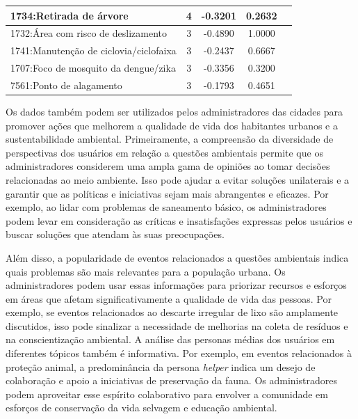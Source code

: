 \begin{table}[htbp]
\begin{tabular}{|l|c|c|c|c|}
		\hline
		1734:Retirada de árvore                     & 4                & -0.3201        & 0.2632           \\
		\hline
		1732:Área com risco de deslizamento         & 3                & -0.4890        & 1.0000           \\
		\hline
		1741:Manutenção de ciclovia/ciclofaixa      & 3                & -0.2437        & 0.6667           \\
		\hline
		1707:Foco de mosquito da dengue/zika        & 3                & -0.3356        & 0.3200           \\
		\hline
		7561:Ponto de alagamento                    & 3                & -0.1793        & 0.4651           \\
		\hline
	\end{tabular}
\end{table}

Os dados também podem ser utilizados pelos administradores das cidades para promover ações que melhorem a qualidade de vida dos habitantes urbanos e a sustentabilidade ambiental. Primeiramente, a compreensão da diversidade de perspectivas dos usuários em relação a questões ambientais permite que os administradores considerem uma ampla gama de opiniões ao tomar decisões relacionadas ao meio ambiente. Isso pode ajudar a evitar soluções unilaterais e a garantir que as políticas e iniciativas sejam mais abrangentes e eficazes. Por exemplo, ao lidar com problemas de saneamento básico, os administradores podem levar em consideração as críticas e insatisfações expressas pelos usuários e buscar soluções que atendam às suas preocupações.

Além disso, a popularidade de eventos relacionados a questões ambientais indica quais problemas são mais relevantes para a população urbana. Os administradores podem usar essas informações para priorizar recursos e esforços em áreas que afetam significativamente a qualidade de vida das pessoas. Por exemplo, se eventos relacionados ao descarte irregular de lixo são amplamente discutidos, isso pode sinalizar a necessidade de melhorias na coleta de resíduos e na conscientização ambiental. A análise das personas médias dos usuários em diferentes tópicos também é informativa. Por exemplo, em eventos relacionados à proteção animal, a predominância da persona \textit{helper} indica um desejo de colaboração e apoio a iniciativas de preservação da fauna. Os administradores podem aproveitar esse espírito colaborativo para envolver a comunidade em esforços de conservação da vida selvagem e educação ambiental.

